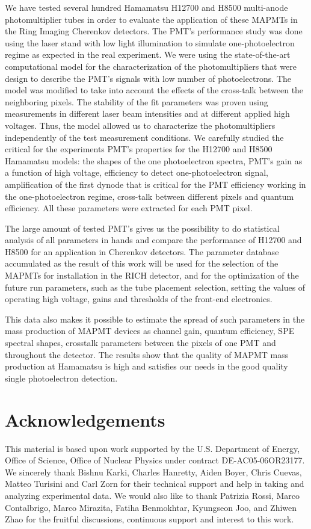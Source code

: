 We have tested several hundred Hamamatsu H12700 and H8500 multi-anode photomultiplier tubes in order to evaluate the application of these MAPMTs in the Ring Imaging Cherenkov detectors. The PMT’s performance study was done using the laser stand with low light illumination to simulate one-photoelectron regime as expected in the real experiment. We were using the state-of-the-art computational model for the characterization of the photomultipliers that were design to describe the PMT’s signals with low number of photoelectrons. 
The model was modified to take into account the effects of the cross-talk between the neighboring pixels. 
The stability of the fit parameters was proven using measurements in different laser beam intensities and at different applied high voltages. Thus, the model allowed us to characterize the photomultipliers independently of the test measurement conditions.
We carefully studied the critical for the experiments PMT's properties for the H12700 and H8500 Hamamatsu models:
the shapes of the one photoelectron spectra,
PMT's gain as a function of high voltage,
efficiency to detect one-photoelectron signal,
amplification of the first dynode that is critical for the PMT efficiency working in the one-photoelectron regime,
cross-talk between different pixels and
quantum efficiency. All these parameters were extracted for each PMT pixel.

The large amount of tested  PMT’s gives us the possibility to do statistical analysis of all parameters in hands and compare the performance of H12700 and H8500 for an application in Cherenkov detectors. The parameter database accumulated as the result of this work will be used for the selection of the MAPMTs for installation in the RICH detector, and for the optimization of the future run parameters, such as the tube placement selection, setting the values of operating high voltage, gains and thresholds of the front-end electronics. 

This data also makes it possible to estimate the spread of such parameters in the mass production of MAPMT devices as channel gain, quantum efficiency, SPE spectral shapes, crosstalk parameters between the pixels of one PMT and throughout the detector.
The results show that the quality of MAPMT mass production at Hamamatsu is high and satisfies our needs in the good quality single photoelectron detection.
 


\section{Acknowledgements}
This material is based upon work supported by the U.S. Department of Energy, Office of Science, Office of Nuclear Physics under contract DE-AC05-06OR23177.
We sincerely thank 
Bishnu Karki,
Charles Hanretty,
Aiden Boyer,
Chris  Cuevas,
Matteo Turisini and
Carl Zorn
for their technical support and help in taking and analyzing experimental  data. We would
also like to thank 
Patrizia Rossi, 
Marco Contalbrigo, 
Marco Mirazita,
Fatiha Benmokhtar,
Kyungseon Joo,
and Zhiwen Zhao
for the fruitful discussions, continuous support and interest to this work.